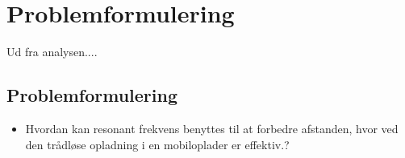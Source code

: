 \chapter{Problemformulering}

Ud fra analysen....

\section{Problemformulering}
\begin{itemize}

\item Hvordan kan resonant frekvens benyttes til at forbedre afstanden, hvor ved den trådløse opladning i en mobiloplader er effektiv.?

\end{itemize}
